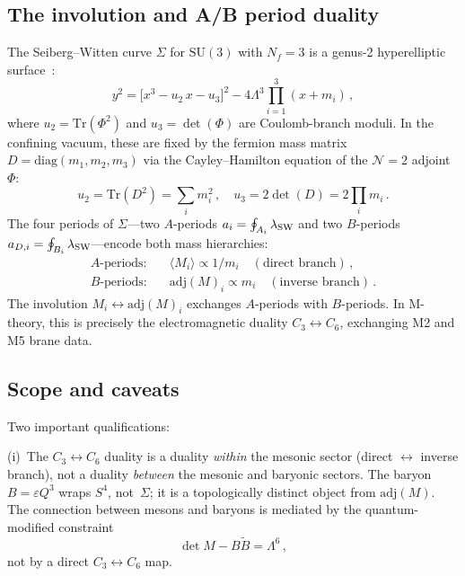 \documentclass[aps,prd,twocolumn,showpacs,preprintnumbers,superscriptaddress,floatfix]{revtex4-2}
\newcommand{\SU}{\mathrm{SU}}
\newcommand{\Nf}{N_{\!f}}
\newcommand{\Tr}{\mathrm{Tr}}
\newcommand{\adj}{\mathrm{adj}}
\newcommand{\diag}{\mathrm{diag}}
\begin{document}
\subsection{The involution and A/B period duality}

The Seiberg--Witten curve $\Sigma$ for $\SU(3)$ with $\Nf = 3$ is
a genus-2 hyperelliptic
surface~\cite{SeibergWitten:1994,ArgyresPlesserShapere:1996}:
\begin{equation}
  y^2 = \bigl[x^3 - u_2\,x - u_3\bigr]^2
    - 4\Lambda^3\prod_{i=1}^{3}(x + m_i)\,,
  \label{eq:SWcurve}
\end{equation}
where $u_2 = \Tr(\Phi^2)$ and $u_3 = \det(\Phi)$ are Coulomb-branch
moduli.
In the confining vacuum, these are fixed by the fermion mass
matrix $D = \diag(m_1, m_2, m_3)$ via the Cayley--Hamilton
equation of the $\mathcal{N}{=}2$ adjoint~$\Phi$:
\begin{equation}
  u_2 = \Tr(D^2) = \sum_i m_i^2\,,\quad
  u_3 = 2\det(D) = 2\prod_i m_i\,.
  \label{eq:Coulomb_moduli}
\end{equation}
The four periods of $\Sigma$---two $A$-periods
$a_i = \oint_{A_i}\lambda_{\rm SW}$ and two $B$-periods
$a_{D,i} = \oint_{B_i}\lambda_{\rm SW}$---encode both mass
hierarchies:
\begin{align}
  A\text{-periods:}\quad &\langle M_i \rangle
    \propto 1/m_i
    \quad (\text{direct branch})\,,
    \label{eq:direct} \\
  B\text{-periods:}\quad &\adj(M)_i
    \propto m_i
    \quad (\text{inverse branch})\,.
    \label{eq:inverse}
\end{align}
The involution $M_i \leftrightarrow \adj(M)_i$ exchanges
$A$-periods with $B$-periods.
In M-theory, this is precisely the electromagnetic duality
$C_3 \leftrightarrow C_6$, exchanging M2 and M5
brane data.

\subsection{Scope and caveats}

Two important qualifications:

(i)~The $C_3 \leftrightarrow C_6$ duality is a duality
\emph{within} the mesonic sector (direct $\leftrightarrow$ inverse
branch), not a duality \emph{between} the mesonic and baryonic
sectors.
The baryon $B = \varepsilon Q^3$ wraps $S^4$, not~$\Sigma$; it is
a topologically distinct object from $\adj(M)$.
The connection between mesons and baryons is mediated by the
quantum-modified constraint
\begin{equation}
  \det M - B\tilde{B} = \Lambda^6\,,
  \label{eq:quantum_constraint}
\end{equation}
not by a direct $C_3 \leftrightarrow C_6$ map.
\end{document}

